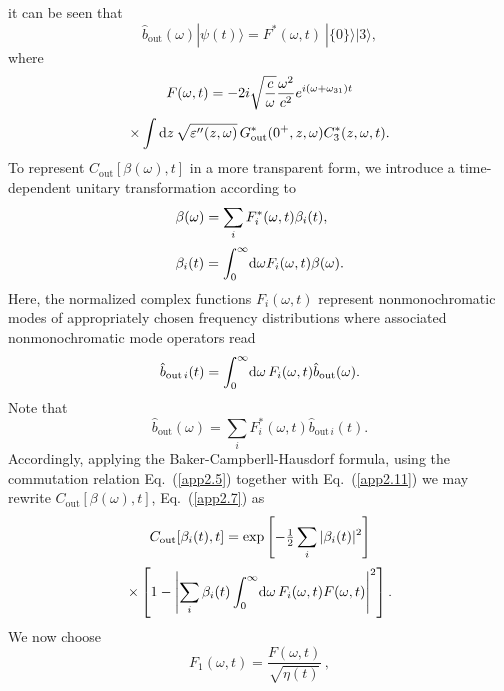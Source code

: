 \documentclass[pra, twocolumn]{revtex4}
\newcommand{\D}{\mbox{\rm d}}
\begin{document}
it can be seen that
\begin{equation}
  \label{app2.11}
  \hat{ b}_{\mathrm{out}}  (\omega)
   |\psi(t)\rangle =
    F^*(\omega, t)
   \
   |\lbrace 0\rbrace\rangle
   |3\rangle
   ,
\end{equation}
where
\begin{multline}
  \label{app2.13}
    F(\omega, t)=
    -2i
   \sqrt{\frac{c}{\omega}}
    \frac{\omega^2}{c^2}
     e^{i(\omega+\omega_{31}) t}
\\[.5ex]
\times
      \int \D z\,
       \sqrt{\varepsilon''(z, \omega)}\,
     G^*_{\rm out}(0^+,z,\omega)
     C_3^*(z,\omega, t)
.
\end{multline}
To represent $C_{\mathrm{out}}[\beta(\omega),t]$ in a more transparent
form, we introduce a time-dependent
unitary transformation according to
\begin{align}
  \label{app2.15}
&
        \beta(\omega)
         =
      \sum_i F_i^\ast
(\omega,t)
\beta_i(t),
\\[.5ex] \label{app2.17}
&
\beta_i(t)
   =
   \int_0^{\infty}\!
    \D\omega
    F_i(\omega,t)
          \beta (\omega )
.
\end{align}
Here, the normalized
complex functions \mbox{$F_i(\omega,t)$} represent nonmonochromatic
modes of appropriately chosen frequency distributions where associated
nonmonochromatic mode operators read
 \begin{equation}
  \label{app2.19}
 \hat{b}_{\mathrm{out}\,i}(t)
      = \int_0^{\infty}\!
      \D\omega\,
    F_i(\omega,t)\hat{b}_{\mathrm {out}} (\omega).
\end{equation}
Note that
\begin{equation}
  \label{app2.21}
\hat{b}_{\mathrm {out}} (\omega)
=
  \sum_i
  F_i^\ast(\omega,t)
  \hat{b}_{\mathrm{out}\,i}(t)
.
\end{equation}
Accordingly, applying the Baker-Campberll-Hausdorf formula, using the
commutation relation Eq.~(\ref{app2.5}) together with
Eq.~(\ref{app2.11}) we may rewrite
$C_{\mathrm{out}}[\beta(\omega),t]$, Eq.~(\ref{app2.7}) as
\begin{multline}
  \label{app2.23}
   C_{\mathrm{out}}[\beta_i(t),t]=
    \exp\left[ -{\textstyle\frac{1}{2}}
    \sum_i
      |\beta_i(t)|^2
    \right]
\\[.5ex]
    \times
    \left[
      1-\left|\sum_i \beta_i(t)
     \int_0^{\infty}\!
     \D\omega\,
     F_i(\omega,t)F(\omega, t)\right|^2
    \right].
\end{multline}
We now choose
\begin{equation}
  \label{app2.25}
    F_1(\omega,t)
    = \frac{F(\omega , t)}{\sqrt{\eta(t)}}\,,
\end{equation}
\end{document}
